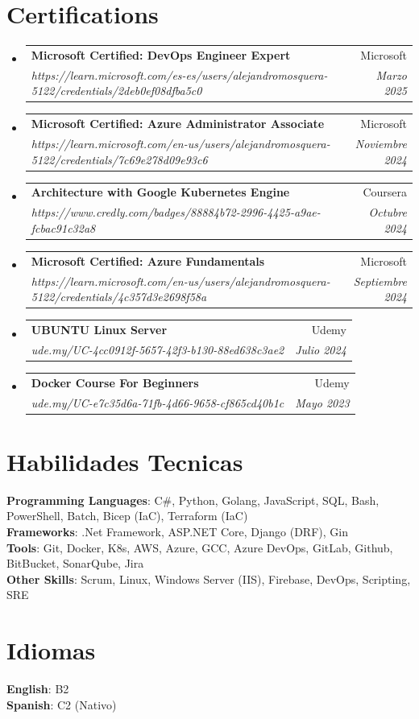 \documentclass[letterpaper,11pt]{article}
\makeatletter
\newcommand{\resumeSubheading}[4]{
  \vspace{-2pt}\item
    \begin{tabular*}{0.97\textwidth}[t]{l@{\extracolsep{\fill}}r}
      \textbf{#1} & #2 \\
      \textit{\small#3} & \textit{\small #4} \\
    \end{tabular*}\vspace{-7pt}
}
\newcommand{\resumeSubHeadingListStart}{\begin{itemize}[leftmargin=0.15in, label={}]}
\newcommand{\resumeSubHeadingListEnd}{\end{itemize}}
\makeatother
\begin{document}
\section{Certifications}
  \resumeSubHeadingListStart
    \resumeSubheading
      {Microsoft Certified: DevOps Engineer Expert}{Microsoft}
      {https://learn.microsoft.com/es-es/users/alejandromosquera-5122/credentials/2deb0ef08dfba5c0}{Marzo 2025}
  \resumeSubHeadingListEnd

  \resumeSubHeadingListStart
    \resumeSubheading
      {Microsoft Certified: Azure Administrator Associate}{Microsoft}
      {https://learn.microsoft.com/en-us/users/alejandromosquera-5122/credentials/7c69e278d09e93c6}{Noviembre 2024}
  \resumeSubHeadingListEnd
  
  \resumeSubHeadingListStart
    \resumeSubheading
      {Architecture with Google Kubernetes Engine}{Coursera}
      {https://www.credly.com/badges/88884b72-2996-4425-a9ae-fcbac91c32a8}{Octubre 2024}
  \resumeSubHeadingListEnd

  \resumeSubHeadingListStart
    \resumeSubheading
      {Microsoft Certified: Azure Fundamentals}{Microsoft}
      {https://learn.microsoft.com/en-us/users/alejandromosquera-5122/credentials/4c357d3e2698f58a}{Septiembre 2024}
  \resumeSubHeadingListEnd
  
  \resumeSubHeadingListStart
    \resumeSubheading
      {UBUNTU Linux Server}{Udemy}
      {ude.my/UC-4cc0912f-5657-42f3-b130-88ed638c3ae2}{Julio 2024}
  \resumeSubHeadingListEnd

  \resumeSubHeadingListStart
    \resumeSubheading
      {Docker Course For Beginners}{Udemy}
      {ude.my/UC-e7c35d6a-71fb-4d66-9658-cf865cd40b1c}{Mayo 2023}
  \resumeSubHeadingListEnd



%

\section{Habilidades Tecnicas}
 \begin{itemize}[leftmargin=0.15in, label={}]
    \small{\item{
     \textbf{Programming Languages}{: C\#, Python, Golang, JavaScript, SQL, Bash, PowerShell, Batch, Bicep (IaC), Terraform (IaC)} \\
     \textbf{Frameworks}{: .Net Framework, ASP.NET Core, Django (DRF), Gin} \\
     \textbf{Tools}{: Git, Docker, K8s, AWS, Azure, GCC, Azure DevOps, GitLab, Github, BitBucket, SonarQube, Jira} \\
     \textbf{Other Skills}{: Scrum, Linux, Windows Server (IIS), Firebase, DevOps, Scripting, SRE}
    }}
 \end{itemize}

\section{Idiomas}
 \begin{itemize}[leftmargin=0.15in, label={}]
    \small{\item{
     \textbf{English}{: B2} \\
     \textbf{Spanish}{: C2 (Nativo)} \\
    }}
 \end{itemize}

\end{document}

